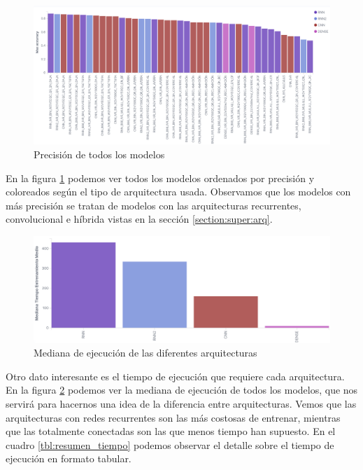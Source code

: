 \begin{figure}[!ht]
	\centering
	\includegraphics[width=1\textwidth]{images/super/resumen_todos}
	\caption{Precisión de todos los modelos}
	\label{fig:resumen_todos}
\end{figure}

En la figura \ref{fig:resumen_todos} podemos ver todos los modelos ordenados por precisión y coloreados según el tipo de arquitectura usada. Observamos que los modelos con más precisión se tratan de modelos con las arquitecturas recurrentes, convolucional e híbrida vistas en la sección \ref{section:super:arq}.



\begin{figure}[!ht]
	\centering
	\includegraphics[width=1\textwidth]{images/super/resumen_tiempo}
	\caption{Mediana de ejecución de las diferentes arquitecturas}
	\label{fig:resumen_tiempo}
\end{figure}

Otro dato interesante es el tiempo de ejecución que requiere cada arquitectura. En la figura \ref{fig:resumen_tiempo} podemos ver la mediana de ejecución de todos los modelos, que nos servirá para hacernos una idea de la diferencia entre arquitecturas. Vemos que las arquitecturas con redes recurrentes son las más costosas de entrenar, mientras que las totalmente conectadas son las que menos tiempo han supuesto. En el cuadro \ref{tbl:resumen_tiempo} podemos observar el detalle sobre el tiempo de ejecución en formato tabular.

